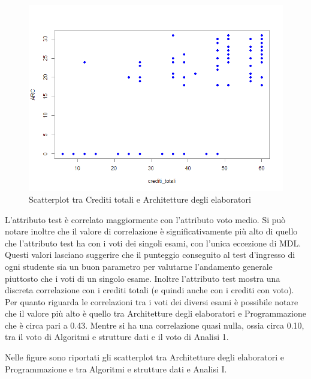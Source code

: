 \documentclass[12pt]{article}
\begin{document}
\begin{figure}[H]
	\includegraphics[width=\textwidth]{img/creditiArc.png}
	\caption{Scatterplot tra Crediti totali e Architetture degli elaboratori}
\end{figure}

L'attributo test è correlato maggiormente con l'attributo voto medio. 
Si può notare inoltre che il valore di correlazione è significativamente più alto di quello che l'attributo test ha con i voti dei singoli esami, con l'unica eccezione di MDL.
Questi valori lasciano suggerire che il punteggio conse\-guito al test d'ingresso di ogni studente sia un buon parametro per valutar\-ne l'andamento generale piuttosto che i voti di un singolo esame.
Inoltre l'attributo test mostra una discreta correlazione con i crediti totali (e quindi anche con i crediti con voto).
Per quanto riguarda le correlazioni tra i voti dei diversi esami è possibi\-le notare che il valore più alto è quello tra Architetture degli elaboratori e Programmazione che è circa pari a 0.43.
Mentre si ha una correlazione quasi nulla, ossia circa 0.10, tra il voto di Algoritmi e strutture dati e il voto di Analisi 1.

Nelle figure sono riportati gli scatterplot tra Architetture degli elabora\-tori e Programmazione e tra Algoritmi e strutture dati  e Analisi I.
\end{document}
